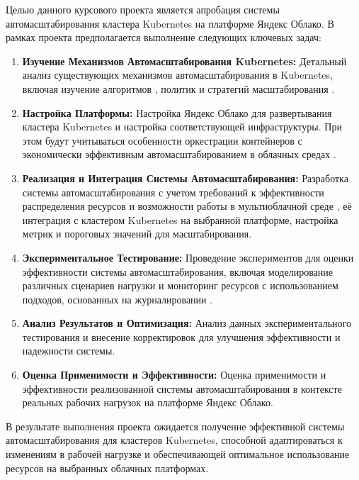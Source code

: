Целью данного курсового проекта является апробация системы автомасштабирования
кластера Kubernetes на платформе Яндекс Облако. В рамках проекта
предполагается выполнение следующих ключевых задач:

\begin{enumerate}
 \item \textbf{Изучение Механизмов Автомасштабирования Kubernetes:} Детальный
анализ существующих механизмов автомасштабирования в Kubernetes, включая
изучение алгоритмов \cite{senjab2023survey}, политик и стратегий масштабирования
\cite{tran2022survey, qu2018auto, millnert2020holoscale}.
 
 \item \textbf{Настройка Платформы:} Настройка Яндекс Облако для развертывания кластера Kubernetes и
настройка соответствующей инфраструктуры. При этом будут учитываться особенности
оркестрации контейнеров с экономически эффективным автомасштабированием в
облачных средах
\cite{rodriguez2020container}.
 
 \item \textbf{Реализация и Интеграция Системы Автомасштабирования:} Разработка
системы автомасштабирования с учетом требований к эффективности распределения
ресурсов
\cite{zhong2020cost} и возможности работы в мультиоблачной среде
\cite{jiang2020cloud},
её интеграция с кластером Kubernetes на выбранной
платформе, настройка метрик и пороговых значений для масштабирования.
 
 \item \textbf{Экспериментальное Тестирование:} Проведение экспериментов для
оценки эффективности системы автомасштабирования, включая моделирование
различных сценариев нагрузки и мониторинг ресурсов с использованием подходов, 
основанных на журналировании \cite{agrawal2018log}.
 
 \item \textbf{Анализ Результатов и Оптимизация:} Анализ данных
экспериментального тестирования и внесение корректировок для улучшения
эффективности и надежности системы.
 
 \item \textbf{Оценка Применимости и Эффективности:} Оценка применимости и
эффективности реализованной системы автомасштабирования в контексте реальных
рабочих нагрузок на платформе Яндекс Облако.
\end{enumerate}

В результате выполнения проекта ожидается получение эффективной системы
автомасштабирования для кластеров Kubernetes, способной адаптироваться к
изменениям в рабочей нагрузке и обеспечивающей оптимальное использование
ресурсов на выбранных облачных платформах.